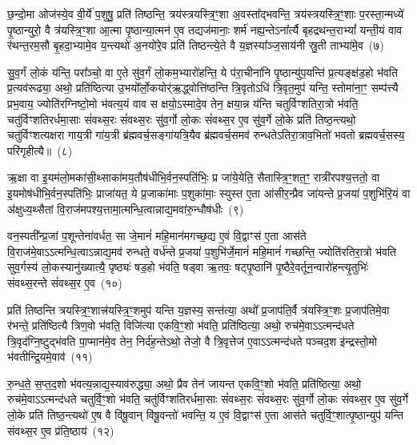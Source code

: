 छ॒न्दो॒मा ओज॑स्ये॒व वी॒र्ये॑ प॒शुषु॒ प्रति॑ तिष्ठन्ति॒ त्रय॑स्त्रयस्त्रि॒ꣳ॒शा अ॒वस्ता᳚द्भवन्ति॒ त्रय॑स्त्रयस्त्रि॒ꣳ॒शाः प॒रस्ता॒न्मध्ये॑ पृ॒ष्ठान्युरो॒ वै त्र॑यस्त्रि॒ꣳ॒शा आ॒त्मा पृ॒ष्ठान्या॒त्मन॑ ए॒व तद्यज॑मानाः॒ शर्म॑ नह्य॒न्ते\-ऽना᳚र्त्यै बृहद्रथन्त॒रा\-भ्यां᳚ यन्ती॒यं वाव र॑थन्त॒रम॒सौ बृ॒हदा॒भ्यामे॒व य॒न्त्यथो॑ अ॒नयो॑रे॒व प्रति॑ तिष्ठन्त्ये॒ते वै य॒ज्ञस्या᳚ञ्ज॒साय॑नी स्रु॒ती ताभ्या॑मे॒व~(७)

सु॒व॒र्गं लो॒कं य॑न्ति॒ परा᳚ञ्चो॒ वा ए॒ते सु॑व॒र्गं लो॒कम॒भ्यारो॑हन्ति॒ ये प॑रा॒चीना॑नि पृ॒ष्ठान्यु॑प॒यन्ति॑ प्र॒त्यङ्क्ष॑ड॒हो भ॑वति प्र॒त्यव॑रूढ्या॒ अथो॒ प्रति॑ष्ठित्या उ॒भयो᳚र्लो॒कयोर्॑\mbox{}ऋ॒द्ध्वोत्ति॑ष्ठन्ति त्रि॒वृतो\-ऽधि॑ त्रि॒वृत॒मुप॑ यन्ति॒ स्तोमा॑ना॒ꣳ॒ सम्प॑त्त्यै प्रभ॒वाय॒ ज्योति॑रग्निष्टो॒मो भ॑वत्य॒यं वाव स क्षयो॒\-ऽस्मादे॒व तेन॒ क्षया॒न्न य॑न्ति चतुर्विꣳशतिरा॒त्रो भ॑वति॒ चतु॑र्विꣳशतिरर्धमा॒साः सं॑वथ्स॒रः सं॑वथ्स॒रः सु॑व॒र्गो लो॒कः सं॑वथ्स॒र ए॒व सु॑व॒र्गे लो॒के प्रति॑ तिष्ठ॒न्त्यथो॒ चतु॑र्विꣳशत्यक्षरा गाय॒त्री गा॑य॒त्री ब्र॑ह्मवर्च॒सङ्गा॑यत्रि॒यैव ब्र॑ह्मवर्च॒समव॑ रुन्धते\-ऽतिरा॒त्राव॒भितो॑ भवतो ब्रह्मवर्च॒सस्य॒ परि॑गृहीत्यै॥~(८)

{\anuvakamend[{म॒नु॒ष्य॑स्य मध्य॒तः प॒शव॒स्ताभ्या॑मे॒व सं॑वथ्स॒रश्चतु॑र्विꣳशतिश्च}]}%

ऋ॒क्षा वा इ॒यम॑लो॒मका॑सी॒थ्साका॑मय॒तौष॑धीभि॒र्वन॒स्पति॑भिः॒ प्र जा॑ये॒येति॒ सैतास्त्रि॒ꣳ॒शत॒ꣳ॒ रात्री॑रपश्य॒त्ततो॒ वा इ॒यमोष॑धीभि॒र्वन॒स्पति॑भिः॒ प्राजा॑यत॒ ये प्र॒जाका॑माः प॒शुका॑माः॒ स्युस्त ए॒ता आ॑सीर॒न्प्रैव जा॑यन्ते प्र॒जया॑ प॒शुभि॑रि॒यं वा अ॑क्षुध्य॒थ्सैतां वि॒राज॑मपश्य॒त्तामा॒त्मन्धि॒त्वान्नाद्य॒मवा॑रु॒न्धौष॑धीः~(९)

वन॒स्पती᳚न्प्र॒जां प॒शून्तेना॑वर्धत॒ सा जे॒मानं॑ महि॒मान॑मगच्छ॒द्य ए॒वं वि॒द्वाꣳस॑ ए॒ता आस॑ते वि॒राज॑मे॒वा\-ऽऽ\-त्मन्धि॒त्वा\-ऽन्नाद्य॒मव॑ रुन्धते॒ वर्ध॑न्ते प्र॒जया॑ प॒शुभि॑र्जे॒मानं॑ महि॒मानं॑ गच्छन्ति॒ ज्योति॑रतिरा॒त्रो भ॑वति सुव॒र्गस्य॑ लो॒कस्यानु॑\-ख्यात्यै॒ पृष्ठ्यः॑ षड॒हो भ॑वति॒ षड्वा ऋ॒तवः॒ षट्पृ॒ष्ठानि॑ पृ॒ष्ठैरे॒वर्तून॒न्वारो॑हन्त्यृ॒तुभिः॑ संवथ्स॒रन्ते सं॑वथ्स॒र ए॒व~(१०)

प्रति॑ तिष्ठन्ति त्रयस्त्रि॒ꣳ॒शात्त्र॑यस्त्रि॒ꣳ॒शमुप॑ यन्ति य॒ज्ञस्य॒ सन्त॑त्या॒ अथो᳚ प्र॒जा\-प॑ति॒र्वै त्र॑यस्त्रि॒ꣳ॒शः प्र॒जा\-प॑तिमे॒वा र॑भन्ते॒ प्रति॑ष्ठित्यै त्रिण॒वो भ॑वति॒ विजि॑त्या एकवि॒ꣳ॒शो भ॑वति॒ प्रति॑ष्ठित्या॒ अथो॒ रुच॑मे॒वा\-ऽऽ\-त्मन्द॑धते त्रि॒वृद॑ग्नि॒ष्टुद्भ॑वति पा॒प्मान॑मे॒व तेन॒ निर्द॑ह॒न्ते\-ऽथो॒ तेजो॒ वै त्रि॒वृत्तेज॑ ए॒वा\-ऽऽ\-त्मन्द॑धते पञ्चद॒श इ॑न्द्रस्तो॒मो भ॑वतीन्द्रि॒यमे॒वाव॑~(११)

रु॒न्ध॒ते॒ स॒प्त॒द॒शो भ॑वत्य॒न्नाद्य॒स्याव॑रुद्ध्या॒ अथो॒ प्रैव तेन॑ जायन्त एकवि॒ꣳ॒शो भ॑वति॒ प्रति॑ष्ठित्या॒ अथो॒ रुच॑मे॒वा\-ऽऽ\-त्मन्द॑धते चतुर्वि॒ꣳ॒शो भ॑वति॒ चतु॑र्विꣳशतिरर्धमा॒साः सं॑वथ्स॒रः सं॑वथ्स॒रः सु॑व॒र्गो लो॒कः सं॑वथ्स॒र ए॒व सु॑व॒र्गे लो॒के प्रति॑ तिष्ठ॒न्त्यथो॑ ए॒ष वै वि॑षू॒वान् वि॑षू॒वन्तो॑ भवन्ति॒ य ए॒वं वि॒द्वाꣳस॑ ए॒ता आस॑ते चतुर्वि॒ꣳ॒शात्पृ॒ष्ठान्युप॑ यन्ति संवथ्स॒र ए॒व प्र॑ति॒ष्ठाय॑~(१२)

